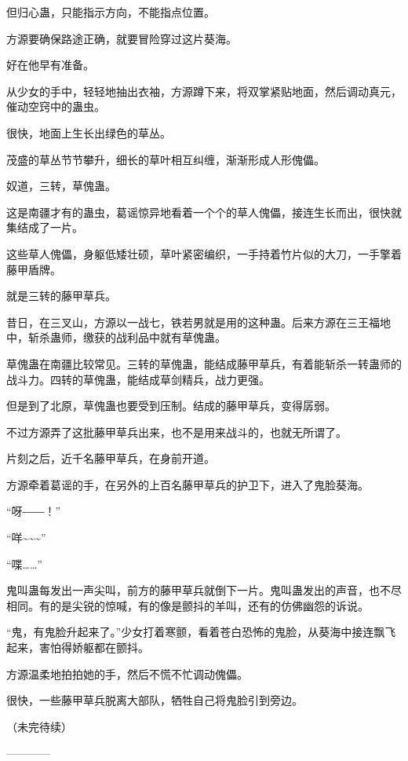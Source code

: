 \begin{this_body}
但归心蛊，只能指示方向，不能指点位置。

方源要确保路途正确，就要冒险穿过这片葵海。

好在他早有准备。

从少女的手中，轻轻地抽出衣袖，方源蹲下来，将双掌紧贴地面，然后调动真元，催动空窍中的蛊虫。

很快，地面上生长出绿色的草丛。

茂盛的草丛节节攀升，细长的草叶相互纠缠，渐渐形成人形傀儡。

奴道，三转，草傀蛊。

这是南疆才有的蛊虫，葛谣惊异地看着一个个的草人傀儡，接连生长而出，很快就集结成了一片。

这些草人傀儡，身躯低矮壮硕，草叶紧密编织，一手持着竹片似的大刀，一手擎着藤甲盾牌。

就是三转的藤甲草兵。

昔日，在三叉山，方源以一战七，铁若男就是用的这种蛊。后来方源在三王福地中，斩杀蛊师，缴获的战利品中就有草傀蛊。

草傀蛊在南疆比较常见。三转的草傀蛊，能结成藤甲草兵，有着能斩杀一转蛊师的战斗力。四转的草傀蛊，能结成草剑精兵，战力更强。

但是到了北原，草傀蛊也要受到压制。结成的藤甲草兵，变得孱弱。

不过方源弄了这批藤甲草兵出来，也不是用来战斗的，也就无所谓了。

片刻之后，近千名藤甲草兵，在身前开道。

方源牵着葛谣的手，在另外的上百名藤甲草兵的护卫下，进入了鬼脸葵海。

“呀――！”

“咩\~{}\~{}\~{}”

“喋……”

鬼叫蛊每发出一声尖叫，前方的藤甲草兵就倒下一片。鬼叫蛊发出的声音，也不尽相同。有的是尖锐的惊喊，有的像是颤抖的羊叫，还有的仿佛幽怨的诉说。

“鬼，有鬼脸升起来了。”少女打着寒颤，看着苍白恐怖的鬼脸，从葵海中接连飘飞起来，害怕得娇躯都在颤抖。

方源温柔地拍拍她的手，然后不慌不忙调动傀儡。

很快，一些藤甲草兵脱离大部队，牺牲自己将鬼脸引到旁边。

（未完待续）

------------

\end{this_body}

